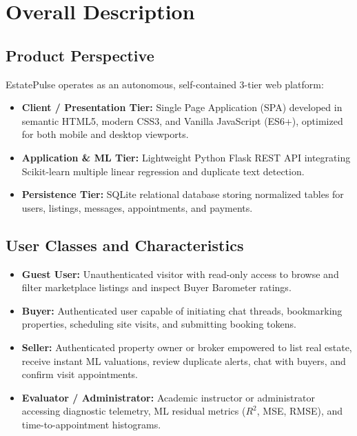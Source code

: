 \documentclass[11pt,a4paper]{article}
\begin{document}
\newpage
\section{Overall Description}

\subsection{Product Perspective}
EstatePulse operates as an autonomous, self-contained 3-tier web platform:
\begin{itemize}[leftmargin=0.8cm]
    \item \textbf{Client / Presentation Tier:} Single Page Application (SPA) developed in semantic HTML5, modern CSS3, and Vanilla JavaScript (ES6+), optimized for both mobile and desktop viewports.
    \item \textbf{Application \& ML Tier:} Lightweight Python Flask REST API integrating Scikit-learn multiple linear regression and duplicate text detection.
    \item \textbf{Persistence Tier:} SQLite relational database storing normalized tables for users, listings, messages, appointments, and payments.
\end{itemize}

\subsection{User Classes and Characteristics}
\begin{itemize}[leftmargin=0.8cm]
    \item \textbf{Guest User:} Unauthenticated visitor with read-only access to browse and filter marketplace listings and inspect Buyer Barometer ratings.
    \item \textbf{Buyer:} Authenticated user capable of initiating chat threads, bookmarking properties, scheduling site visits, and submitting booking tokens.
    \item \textbf{Seller:} Authenticated property owner or broker empowered to list real estate, receive instant ML valuations, review duplicate alerts, chat with buyers, and confirm visit appointments.
    \item \textbf{Evaluator / Administrator:} Academic instructor or administrator accessing diagnostic telemetry, ML residual metrics ($R^2$, MSE, RMSE), and time-to-appointment histograms.
\end{itemize}
\end{document}
